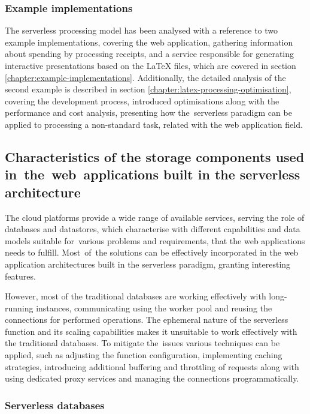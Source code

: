 \subsubsection{Example implementations}

The serverless processing model has been analysed with a reference to two example implementations, covering the web application, gathering information about spending by processing receipts, and a service responsible for generating interactive presentations based on the LaTeX files, which are covered in section \ref{chapter:example-implementations}.
Additionally, the detailed analysis of the second example is described in section \ref{chapter:latex-processing-optimisation}, covering the development process, introduced optimisations along with the performance and cost analysis, presenting how the~serverless paradigm can be applied to processing a non-standard task, related with the web application field.

\subsection{Characteristics of the storage components used in~the~web~applications built in the serverless architecture}

The cloud platforms provide a wide range of available services, serving the role of databases and datastores, which characterise with different capabilities and data models suitable for~various problems and requirements, that the web applications needs to fulfill.
Most~of~the solutions can be effectively incorporated in the web application architectures built in the serverless paradigm, granting interesting features.

However, most of the traditional databases are working effectively with long-running instances, communicating using the worker pool and reusing the connections for performed operations.
The ephemeral nature of the serverless function and its scaling capabilities makes it unsuitable to work effectively with the traditional databases.
To mitigate the~issues various techniques can be applied, such as adjusting the function configuration, implementing caching strategies, introducing additional buffering and throttling of requests along with using dedicated proxy services and managing the connections programmatically.

\subsubsection{Serverless databases}

